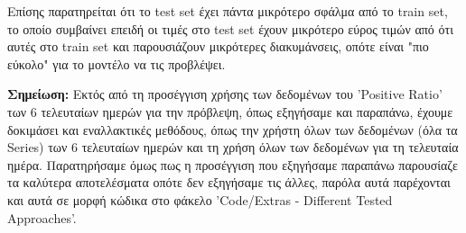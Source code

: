 \documentclass[12pt,a4paper]{article}
\begin{document}
Επίσης παρατηρείται ότι το test set έχει πάντα μικρότερο σφάλμα από το train set, το οποίο συμβαίνει επειδή οι τιμές στο test set έχουν μικρότερο εύρος τιμών από ότι αυτές στο train set και παρουσιάζουν μικρότερες διακυμάνσεις, οπότε είναι "πιο εύκολο" για το μοντέλο να τις προβλέψει.

\textbf{Σημείωση:} Εκτός από τη προσέγγιση χρήσης των δεδομένων του 'Positive Ratio' των 6 τελευταίων ημερών για την πρόβλεψη, όπως εξηγήσαμε και παραπάνω, έχουμε δοκιμάσει και εναλλακτικές μεθόδους, όπως την χρήστη όλων των δεδομένων (όλα τα Series) των 6 τελευταίων ημερών και τη χρήση όλων των δεδομένων για τη τελευταία ημέρα. Παρατηρήσαμε όμως πως η προσέγγιση που εξηγήσαμε παραπάνω παρουσίαζε τα καλύτερα αποτελέσματα οπότε δεν εξηγήσαμε τις άλλες, παρόλα αυτά παρέχονται και αυτά σε μορφή κώδικα στο φάκελο 'Code/Extras - Different Tested Approaches'.
\end{document}
